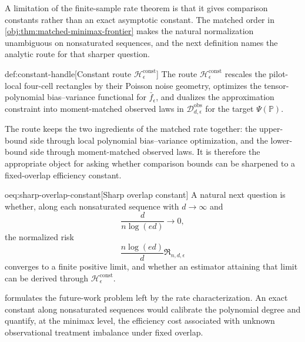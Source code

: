 A limitation of the finite-sample rate theorem is that it gives comparison constants rather than an exact asymptotic constant. The matched order in \cref{obj:thm:matched-minimax-frontier} makes the natural normalization unambiguous on nonsaturated sequences, and the next definition names the analytic route for that sharper question.

\begin{definitionv}{def:constant-handle}[Constant route \(\mathscr H_\epsilon^{\mathrm{const}}\)]
The route \(\mathscr H_\epsilon^{\mathrm{const}}\) rescales the pilot-local four-cell rectangles by their Poisson noise geometry, optimizes the tensor-polynomial bias--variance functional for \(\bar f_\epsilon\), and dualizes the approximation constraint into moment-matched observed laws in \(\mathcal D_{d,\epsilon}^{\mathrm{obs}}\) for the target \(\Psi(\mathbb P)\).
\end{definitionv}

The route  keeps the two ingredients of the matched rate together: the upper-bound side through local polynomial bias--variance optimization, and the lower-bound side through moment-matched observed laws. It is therefore the appropriate object for asking whether comparison bounds can be sharpened to a fixed-overlap efficiency constant.

\begin{remarkv}{oeq:sharp-overlap-constant}[Sharp overlap constant]
A natural next question is whether, along each nonsaturated sequence with \(d\to\infty\) and
\[
\frac{d}{n\log(ed)}\to0,
\]
the normalized risk
\[
\frac{n\log(ed)}{d}\mathfrak R_{n,d,\epsilon}
\]
converges to a finite positive limit, and whether an estimator attaining that limit can be derived through \(\mathscr H_\epsilon^{\mathrm{const}}\).
\end{remarkv}

 formulates the future-work problem left by the rate characterization. An exact constant along nonsaturated sequences would calibrate the polynomial degree and quantify, at the minimax level, the efficiency cost associated with unknown observational treatment imbalance under fixed overlap.

